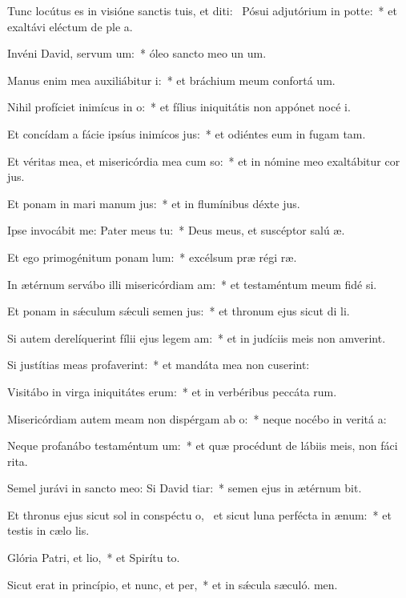 \item Tunc locútus es in visióne sanctis tuis, et diti:~\pscross{} Pósui adjutórium in potte:~* et exaltávi eléctum de ple a.
\item Invéni David, servum um:~* óleo sancto meo un um.
\item Manus enim mea auxiliábitur i:~* et bráchium meum confortá um.
\item Nihil profíciet inimícus in o:~* et fílius iniquitátis non appónet nocé i.
\item Et concídam a fácie ipsíus inimícos jus:~* et odiéntes eum in fugam tam.
\item Et véritas mea, et misericórdia mea cum so:~* et in nómine meo exaltábitur cor jus.
\item Et ponam in mari manum jus:~* et in flumínibus déxte jus.
\item Ipse invocábit me: Pater meus  tu:~* Deus meus, et suscéptor salú æ.
\item Et ego primogénitum ponam lum:~* excélsum præ régi ræ.
\item In ætérnum servábo illi misericórdiam am:~* et testaméntum meum fidé si.
\item Et ponam in sǽculum sǽculi semen jus:~* et thronum ejus sicut di li.
\item Si autem derelíquerint fílii ejus legem am:~* et in judíciis meis non amverint.
\item Si justítias meas profaverint:~* et mandáta mea non cuserint:
\item Visitábo in virga iniquitátes erum:~* et in verbéribus peccáta rum.
\item Misericórdiam autem meam non dispérgam ab o:~* neque nocébo in veritá a:
\item Neque profanábo testaméntum um:~* et quæ procédunt de lábiis meis, non fáci rita.
\item Semel jurávi in sancto meo: Si David tiar:~* semen ejus in ætérnum bit.
\item Et thronus ejus sicut sol in conspéctu o,~\pscross{} et sicut luna perfécta in ænum:~* et testis in cælo lis.
\item Glória Patri, et lio,~* et Spirítu to.
\item Sicut erat in princípio, et nunc, et per,~* et in sǽcula sæculó. men.
